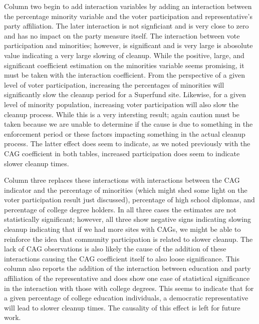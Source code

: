 \documentclass[12pt]{article}
\begin{document}
{Column two begin to add interaction variables by adding an interaction between the percentage minority variable and the voter participation and representative's party affiliation. The later interaction is not signficiant and is very close to zero and has no impact on the party measure itself. The interaction between vote participation and minorities; however, is significant and is very large is abosolute value indicating a very large slowing of cleanup. While the positive, large, and significant coefficient estimation on the minorities variable seems promising, it must be taken with the interaction coefficient. From the perspective of a given level of voter participation, increasing the percentages of minorities will significantly slow the cleanup period for a Superfund site. Likewise, for a given level of minority population, increasing voter participation will also slow the cleanup process. While this is a very intersting result; again caution must be taken because we are unable to determine if the cause is due to something in the enforcement period or these factors impacting something in the actual cleanup process. The latter effect does seem to indicate, as we noted previously with the CAG coefficient in both tables, increased participation does seem to indicate slower cleanup times. 

Column three replaces these interactions with interactions between the CAG indicator and the percentage of minorities (which might shed some light on the voter participation result just discussed), percentage of high school diplomas, and percentage of college degree holders. In all three cases the estimates are not statistically significant; however, all three show negative signs indicating slowing cleanup indicating that if we had more sites with CAGs, we might be able to reinforce the idea that community participation is related to slower cleanup. The lack of CAG observations is also likely the cause of the addition of these interactions causing the CAG coefficient itself to also loose significance. This column also reports the addition of the interaction between education and party affiliation of the representative and does show one case of statistical significance in the interaction with those with college degrees. This seems to indicate that for a given percentage of college education individuals, a democratic representative will lead to slower cleanup times. The causality of this effect is left for future work. 

}
\end{document}
